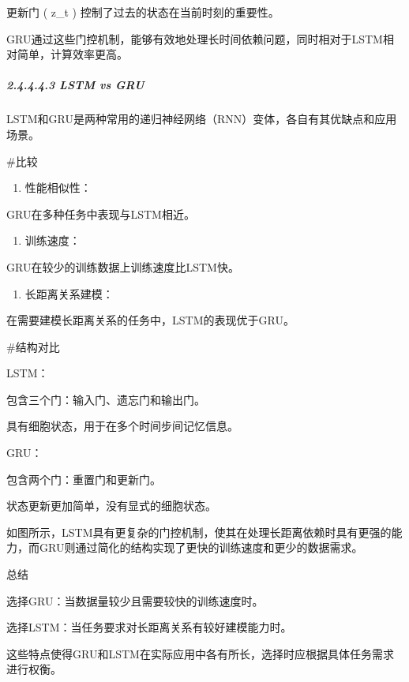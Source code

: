 更新门 ( z\_t ) 控制了过去的状态在当前时刻的重要性。

GRU通过这些门控机制，能够有效地处理长时间依赖问题，同时相对于LSTM相对简单，计算效率更高。

\subparagraph{\texorpdfstring{\textbf{2.4.4.4.3} \textbf{LSTM vs
GRU}}{2.4.4.4.3 LSTM vs GRU}}\label{24443-lstm-vs-gru}

LSTM和GRU是两种常用的递归神经网络（RNN）变体，各自有其优缺点和应用场景。

\#比较

\begin{enumerate}
\def\labelenumi{\arabic{enumi}.}
\item
  性能相似性：
\end{enumerate}

GRU在多种任务中表现与LSTM相近。

\begin{enumerate}
\def\labelenumi{\arabic{enumi}.}
\item
  训练速度：
\end{enumerate}

GRU在较少的训练数据上训练速度比LSTM快。

\begin{enumerate}
\def\labelenumi{\arabic{enumi}.}
\item
  长距离关系建模：
\end{enumerate}

在需要建模长距离关系的任务中，LSTM的表现优于GRU。

\#结构对比

LSTM：

包含三个门：输入门、遗忘门和输出门。

具有细胞状态，用于在多个时间步间记忆信息。

GRU：

包含两个门：重置门和更新门。

状态更新更加简单，没有显式的细胞状态。

如图所示，LSTM具有更复杂的门控机制，使其在处理长距离依赖时具有更强的能力，而GRU则通过简化的结构实现了更快的训练速度和更少的数据需求。


总结

选择GRU：当数据量较少且需要较快的训练速度时。

选择LSTM：当任务要求对长距离关系有较好建模能力时。

这些特点使得GRU和LSTM在实际应用中各有所长，选择时应根据具体任务需求进行权衡。

